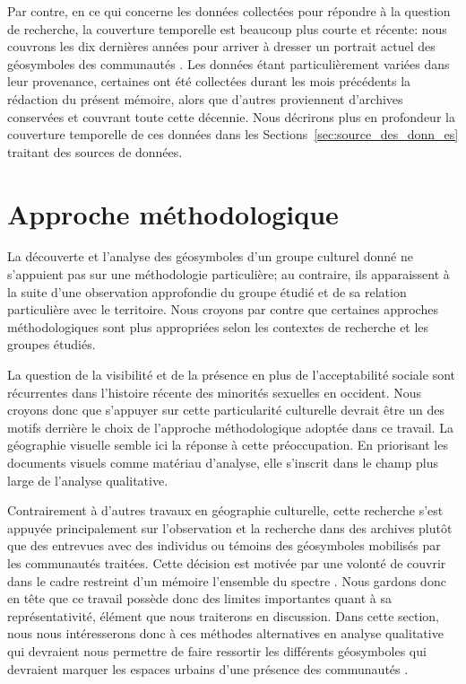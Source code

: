 Par contre, en ce qui concerne les données collectées pour répondre à la question de recherche, la couverture temporelle est beaucoup plus courte et récente: nous couvrons les dix dernières années pour arriver à dresser un portrait actuel des géosymboles des communautés \lgbt{}. 
Les données étant particulièrement variées dans leur provenance, certaines ont été collectées durant les mois précédents la rédaction du présent mémoire, alors que d'autres proviennent d'archives conservées et couvrant toute cette décennie. 
Nous décrirons plus en profondeur la couverture temporelle de ces données dans les Sections~\ref{sec:source_des_donn_es} traitant des sources de données.

\section{Approche méthodologique}
\label{sec:approche_m_thodologique}
La découverte et l'analyse des géosymboles d'un groupe culturel donné ne s'appuient pas sur une méthodologie particulière; au contraire, ils apparaissent à la suite d'une observation approfondie du groupe étudié et de sa relation particulière avec le territoire. 
Nous croyons par contre que certaines approches méthodologiques sont plus appropriées selon les contextes de recherche et les groupes étudiés.

La question de la visibilité et de la présence en plus de l'acceptabilité sociale sont récurrentes dans l'histoire récente des minorités sexuelles en occident. 
Nous croyons donc que s'appuyer sur cette particularité culturelle devrait être un des motifs derrière le choix de l'approche méthodologique adoptée dans ce travail. 
La géographie visuelle semble ici la réponse à cette préoccupation. 
En priorisant les documents visuels comme matériau d'analyse, elle s'inscrit dans le champ plus large de l'analyse qualitative.

Contrairement à d'autres travaux en géographie culturelle, cette recherche s'est appuyée principalement sur l'observation et la recherche dans des archives plutôt que des entrevues avec des individus \lgbt{} ou témoins des géosymboles mobilisés par les communautés traitées. 
Cette décision est motivée par une volonté de couvrir dans le cadre restreint d'un mémoire l'ensemble du spectre \lgbt{}.
Nous gardons donc en tête que ce travail possède donc des limites importantes quant à sa représentativité, élément que nous traiterons en discussion.
Dans cette section, nous nous intéresserons donc à ces méthodes alternatives en analyse qualitative qui devraient nous permettre de faire ressortir les différents géosymboles qui devraient marquer les espaces urbains d'une présence des communautés \lgbt{}.

